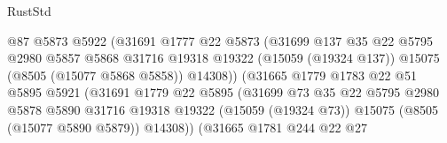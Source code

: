 \begin{lexlean}{RustStd}
\begin{coremodule}
                                      @87
                                      @5873
                                      @5922
                                      (@31691
                                        @1777
                                        @22
                                        @5873
                                        (@31699
                                          @137
                                          @35
                                          @22
                                          @5795
                                          @2980
                                          @5857
                                          @5868
                                          @31716
                                          @19318
                                          @19322
                                          (@15059 (@19324 @137))
                                          @15075
                                          (@8505 (@15077 @5868 @5858))
                                          @14308))
                                      (@31665
                                        @1779
                                        @1783
                                        @22
                                        @51
                                        @5895
                                        @5921
                                        (@31691
                                          @1779
                                          @22
                                          @5895
                                          (@31699
                                            @73
                                            @35
                                            @22
                                            @5795
                                            @2980
                                            @5878
                                            @5890
                                            @31716
                                            @19318
                                            @19322
                                            (@15059 (@19324 @73))
                                            @15075
                                            (@8505 (@15077 @5890 @5879))
                                            @14308))
                                        (@31665
                                          @1781
                                          @244
                                          @22
                                          @27

\end{coremodule}
\end{lexlean}
